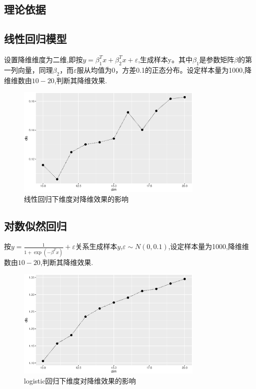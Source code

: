 \subsection{理论依据}

\subsection{线性回归模型}

设置降维维度为二维,即按$y=\beta_1^Tx+\beta_2^Tx+\varepsilon$,生成样本y。其中$\beta_1$是参数矩阵$\beta$的第一列向量，同理$\beta_2$，而$\varepsilon$服从均值为0，方差0.1的正态分布。设定样本量为1000,降维维数由$10-20$,判断其降维效果.
\begin{figure}[H]
    \centering
    \includegraphics[width=0.8\textwidth]{image/norm_iht.eps}
    \caption{线性回归下维度对降维效果的影响}
\end{figure}




\subsection{对数似然回归}

按$y = \frac{1}{1+\exp{(-\beta^Tx)}}+ \varepsilon$关系生成样本$y$,$\varepsilon \sim N(0,0.1)$,设定样本量为1000,降维维数由$10-20$,判断其降维效果.
\begin{figure}[H]
    \centering
    \includegraphics[width=0.8\textwidth]{image/logit_save.eps}
    \caption{logistic回归下维度对降维效果的影响}
\end{figure}


